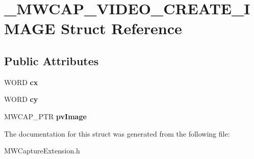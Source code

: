 \hypertarget{struct__MWCAP__VIDEO__CREATE__IMAGE}{\section{\-\_\-\-M\-W\-C\-A\-P\-\_\-\-V\-I\-D\-E\-O\-\_\-\-C\-R\-E\-A\-T\-E\-\_\-\-I\-M\-A\-G\-E Struct Reference}
\label{struct__MWCAP__VIDEO__CREATE__IMAGE}
}
\subsection*{Public Attributes}
\begin{DoxyCompactItemize}
\item 
\hypertarget{struct__MWCAP__VIDEO__CREATE__IMAGE_a7d393d712aea6a78afdb787a6d2a221a}{W\-O\-R\-D {\bfseries cx}}\label{struct__MWCAP__VIDEO__CREATE__IMAGE_a7d393d712aea6a78afdb787a6d2a221a}

\item 
\hypertarget{struct__MWCAP__VIDEO__CREATE__IMAGE_a7bfb8221869181e15207de9db4462e76}{W\-O\-R\-D {\bfseries cy}}\label{struct__MWCAP__VIDEO__CREATE__IMAGE_a7bfb8221869181e15207de9db4462e76}

\item 
\hypertarget{struct__MWCAP__VIDEO__CREATE__IMAGE_aaff9fcc0ea7d14d953a9e0daa532e38e}{M\-W\-C\-A\-P\-\_\-\-P\-T\-R {\bfseries pv\-Image}}\label{struct__MWCAP__VIDEO__CREATE__IMAGE_aaff9fcc0ea7d14d953a9e0daa532e38e}

\end{DoxyCompactItemize}


The documentation for this struct was generated from the following file\-:\begin{DoxyCompactItemize}
\item 
M\-W\-Capture\-Extension.\-h\end{DoxyCompactItemize}
